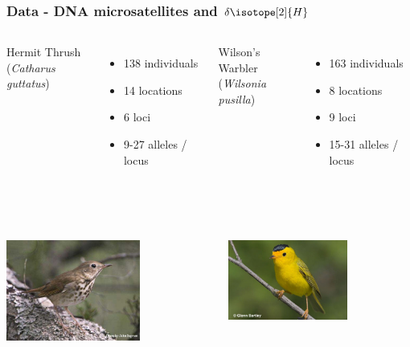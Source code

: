 \documentclass[t]{beamer}\usepackage[]{graphicx}\usepackage[]{color}
\begin{document}
\begin{frame}[t]
\frametitle{Data - DNA microsatellites and $\delta \isotope[2]{H}$}

\begin{columns}[t]
Hermit Thrush \\
(\textit{Catharus guttatus}) \\
\vspace{2mm}
\begin{itemize}
\item 138 individuals
\item 14 locations
\item 6 loci
\item 9-27 alleles / locus
\end{itemize}
Wilson's Warbler \\
(\textit{Wilsonia pusilla}) \\
\vspace{2mm}
\begin{itemize}
\item 163 individuals
\item 8 locations
\item 9 loci
\item 15-31 alleles / locus
\end{itemize}

\end{columns}

~\\

\begin{columns}[t]
\begin{center}
\includegraphics[width=0.65\textwidth]{figs/hermit_thrush.jpeg}
\end{center}
\begin{center}
\includegraphics[width=0.65\textwidth]{figs/wilsons_warbler.jpeg}
\end{center}
\end{columns}



\end{frame}
\end{document}
